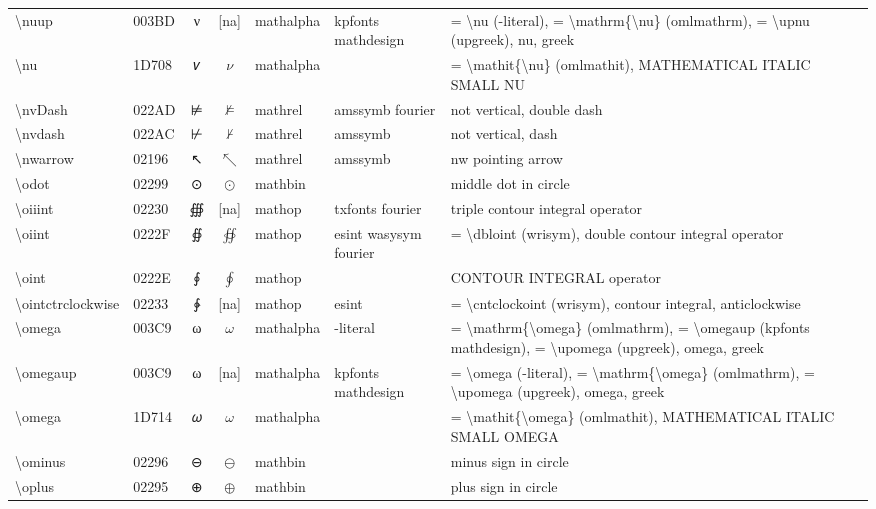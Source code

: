 \documentclass[a4paper,landscape]{article}
\begin{document}
\begin{longtable}{llcclll}
\textbackslash{}nuup & 003BD & ν & [na] & mathalpha & kpfonts mathdesign & = \textbackslash{}nu (-literal), = \textbackslash{}mathrm\{\textbackslash{}nu\} (omlmathrm),  = \textbackslash{}upnu (upgreek),  nu,  greek \\
\textbackslash{}nu & 1D708 & 𝜈 & $\nu$ & mathalpha &  & = \textbackslash{}mathit\{\textbackslash{}nu\} (omlmathit), MATHEMATICAL ITALIC SMALL NU \\
\textbackslash{}nvDash & 022AD & ⊭ & $\nvDash$ & mathrel & amssymb fourier & not vertical, double dash \\
\textbackslash{}nvdash & 022AC & ⊬ & $\nvdash$ & mathrel & amssymb & not vertical, dash \\
\textbackslash{}nwarrow & 02196 & ↖ & $\nwarrow$ & mathrel & amssymb & nw pointing arrow \\
\textbackslash{}odot & 02299 & ⊙ & $\odot$ & mathbin &  & middle dot in circle \\
\textbackslash{}oiiint & 02230 & ∰ & [na] & mathop & txfonts fourier & triple contour integral operator \\
\textbackslash{}oiint & 0222F & ∯ & $\oiint$ & mathop & esint wasysym fourier & = \textbackslash{}dbloint (wrisym), double contour integral operator \\
\textbackslash{}oint & 0222E & ∮ & $\oint$ & mathop &  & CONTOUR INTEGRAL operator \\
\textbackslash{}ointctrclockwise & 02233 & ∳ & [na] & mathop & esint & = \textbackslash{}cntclockoint (wrisym), contour integral, anticlockwise \\
\textbackslash{}omega & 003C9 & ω & $\omega$ & mathalpha & -literal & = \textbackslash{}mathrm\{\textbackslash{}omega\} (omlmathrm), = \textbackslash{}omegaup (kpfonts mathdesign), = \textbackslash{}upomega (upgreek), omega, greek \\
\textbackslash{}omegaup & 003C9 & ω & [na] & mathalpha & kpfonts mathdesign & = \textbackslash{}omega (-literal), = \textbackslash{}mathrm\{\textbackslash{}omega\} (omlmathrm),  = \textbackslash{}upomega (upgreek),  omega,  greek \\
\textbackslash{}omega & 1D714 & 𝜔 & $\omega$ & mathalpha &  & = \textbackslash{}mathit\{\textbackslash{}omega\} (omlmathit), MATHEMATICAL ITALIC SMALL OMEGA \\
\textbackslash{}ominus & 02296 & ⊖ & $\ominus$ & mathbin &  & minus sign in circle \\
\textbackslash{}oplus & 02295 & ⊕ & $\oplus$ & mathbin &  & plus sign in circle \\

\end{longtable}
\end{document}
